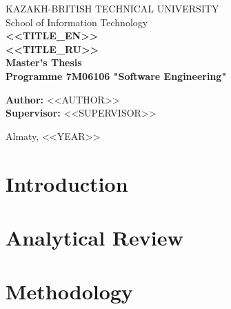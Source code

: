 \documentclass[14pt, a4paper, oneside]{extreport}
\numberwithin{equation}{chapter}
\newcommand{\ThesisTitleEN}{<<TITLE_EN>>}
\newcommand{\ThesisTitleRU}{<<TITLE_RU>>}
\newcommand{\AuthorName}{<<AUTHOR>>}
\newcommand{\SupervisorName}{<<SUPERVISOR>>}
\newcommand{\DefenceYear}{<<YEAR>>}
\newcommand{\ProgramCode}{7M06106}
\newcommand{\ProgramName}{Software Engineering}
\newcommand{\University}{Kazakh-British Technical University}
\begin{document}
\thispagestyle{nonum}
\begin{titlepage}
  \centering
  \fontsize{14}{16}\selectfont
  \MakeUppercase{\University}\\[6pt]
  School of Information Technology\\[24pt]

  \fontsize{16}{18}\selectfont\bfseries
  \MakeUppercase{\ThesisTitleEN}\\[6pt]
  \MakeUppercase{\ThesisTitleRU}\\[24pt]

  \fontsize{14}{16}\selectfont\mdseries
  Master's Thesis\\
  Programme \ProgramCode{} "\ProgramName"\\[48pt]

  \begin{flushleft}
    \textbf{Author:} \AuthorName\\[6pt]
    \textbf{Supervisor:} \SupervisorName\\[6pt]
  \end{flushleft}

  \vfill
  Almaty, \DefenceYear
\end{titlepage}

\thispagestyle{nonum}

\clearpage

\thispagestyle{nonum}
\tableofcontents
\clearpage

\setcounter{page}{4}   %
\pagestyle{fancy}

\chapter*{Introduction}


\chapter{Analytical Review}


\chapter{Methodology}

\end{document}
